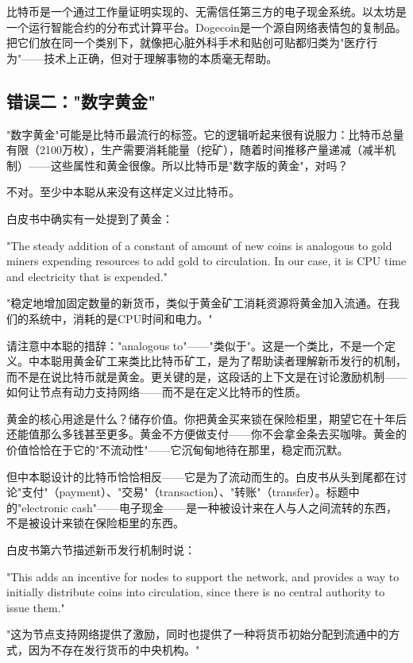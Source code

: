 \documentclass[a4paper,12pt,openany]{ctexbook}
\newenvironment{quoting}{%
  \par\vspace{0.5em}%
  \begin{list}{}{%
    \setlength{\leftmargin}{2em}%
    \setlength{\rightmargin}{2em}%
    \setlength{\parsep}{0.3em}%
    \setlength{\itemsep}{0pt}%
    \setlength{\topsep}{0pt}%
  }%
  \item\relax
}{%
  \end{list}%
  \par\vspace{0.5em}%
}
\begin{document}
比特币是一个通过工作量证明实现的、无需信任第三方的电子现金系统。以太坊是一个运行智能合约的分布式计算平台。Dogecoin是一个源自网络表情包的复制品。把它们放在同一个类别下，就像把心脏外科手术和贴创可贴都归类为"医疗行为"——技术上正确，但对于理解事物的本质毫无帮助。


\subsection*{错误二："数字黄金"}


"数字黄金"可能是比特币最流行的标签。它的逻辑听起来很有说服力：比特币总量有限（2100万枚），生产需要消耗能量（挖矿），随着时间推移产量递减（减半机制）——这些属性和黄金很像。所以比特币是"数字版的黄金"，对吗？

不对。至少中本聪从来没有这样定义过比特币。

白皮书中确实有一处提到了黄金：


\begin{quoting}
\small
"The steady addition of a constant of amount of new coins is analogous to gold miners expending resources to add gold to circulation. In our case, it is CPU time and electricity that is expended."

"稳定地增加固定数量的新货币，类似于黄金矿工消耗资源将黄金加入流通。在我们的系统中，消耗的是CPU时间和电力。"
\end{quoting}


请注意中本聪的措辞："analogous to"——"类似于"。这是一个类比，不是一个定义。中本聪用黄金矿工来类比比特币矿工，是为了帮助读者理解新币发行的机制，而不是在说比特币就是黄金。更关键的是，这段话的上下文是在讨论激励机制——如何让节点有动力支持网络——而不是在定义比特币的性质。

黄金的核心用途是什么？储存价值。你把黄金买来锁在保险柜里，期望它在十年后还能值那么多钱甚至更多。黄金不方便做支付——你不会拿金条去买咖啡。黄金的价值恰恰在于它的"不流动性"——它沉甸甸地待在那里，稳定而沉默。

但中本聪设计的比特币恰恰相反——它是为了流动而生的。白皮书从头到尾都在讨论"支付"（payment）、"交易"（transaction）、"转账"（transfer）。标题中的"electronic cash"——电子现金——是一种被设计来在人与人之间流转的东西，不是被设计来锁在保险柜里的东西。

白皮书第六节描述新币发行机制时说：


\begin{quoting}
\small
"This adds an incentive for nodes to support the network, and provides a way to initially distribute coins into circulation, since there is no central authority to issue them."

"这为节点支持网络提供了激励，同时也提供了一种将货币初始分配到流通中的方式，因为不存在发行货币的中央机构。"
\end{quoting}
\end{document}
